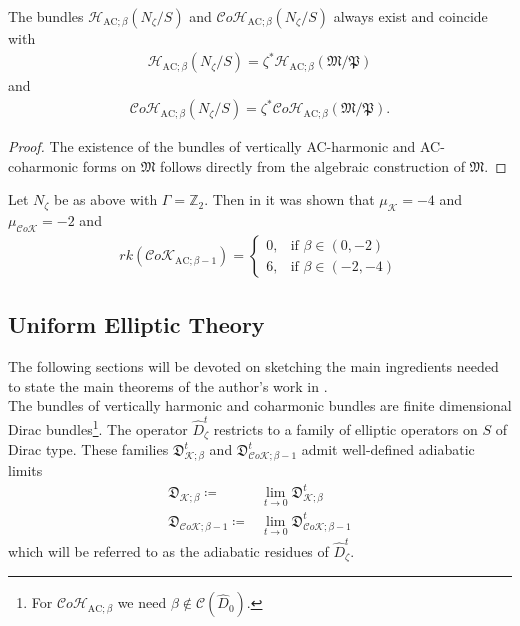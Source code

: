 \documentclass[psamsfonts]{amsart}
\theoremstyle{plain}
\theoremstyle{definition}{
\newtheorem{defi}{Definition}[section]
\newtheorem{ass}{Assumption}
\newtheorem*{nota}{Notation}}
\theoremstyle{remark}{
\newtheorem{rem}{Remark}
\newtheorem{ex}{Example}}
\theoremstyle{plain}{
\newtheorem{thm}{Theorem}[section]
\newtheorem{lem}{Lemma}[section]
\newtheorem{cor}{Corollary}[section]
\newtheorem{prop}{Proposition}[section]
\newtheorem{con}{Conjecture}[section]}
\newcommand{\m}[1]{{\mathrm{#1}}}
\begin{document}
\begin{lem}
\label{bundlesexist}
    The bundles $\mathcal{H}_{\m{AC};\beta}(N_\zeta/S)$ and $\mathcal{C}o\mathcal{H}_{\m{AC};\beta}(N_\zeta/S)$ always exist and coincide with 
    \begin{align*}
        \mathcal{H}_{\m{AC};\beta}(N_\zeta/S)=\zeta^*\mathcal{H}_{\m{AC};\beta}(\mathfrak{M}/\mathfrak{P})
    \end{align*}
    and
    \begin{align*}
        \mathcal{C}o\mathcal{H}_{\m{AC};\beta}(N_\zeta/S)=\zeta^*\mathcal{C}o\mathcal{H}_{\m{AC};\beta}(\mathfrak{M}/\mathfrak{P}).
    \end{align*}
\end{lem}

\begin{proof}
    The existence of the bundles of vertically AC-harmonic and AC-coharmonic forms on $\mathfrak{M}$ follows directly from the algebraic construction of $\mathfrak{M}$.
\end{proof}


\begin{ex}
    Let $N_\zeta$ be as above with $\Gamma=\mathbb{Z}_2$. Then in \cite[Thm. 3.26]{platt} it was shown that $\mu_{\mathcal{K}}=-4$ and $\mu_{\mathcal{C}o\mathcal{K}}=-2$ and
    \begin{align*}
        rk(\mathcal{C}o\mathcal{K}_{\m{AC};\beta-1})=\left\{\begin{array}{ll}
             0,&\text{if } \beta\in(0,-2) \\
             6,&\text{if } \beta\in(-2,-4)
        \end{array}\right.
    \end{align*}
\end{ex}



\subsection{Uniform Elliptic Theory}
\label{Uniform Ellitpic Theory}




The following sections will be devoted on sketching the main ingredients needed to state the main theorems of the author's work in \cite{majewskiDirac}.\\

The bundles of vertically harmonic and coharmonic bundles are finite dimensional Dirac bundles\footnote{For $\mathcal{C}o\mathcal{H}_{\m{AC};\beta}$ we need $\beta\notin\mathcal{C}(\widehat{D}_0)$.}. The operator $\widehat{D}^t_\zeta$ restricts to a family of elliptic operators on $S$ of Dirac type. These families $\mathfrak{D}^t_{\mathcal{K};\beta}$ and $\mathfrak{D}^t_{\mathcal{C}o\mathcal{K};\beta-1}$ admit well-defined adiabatic limits
\begin{align*}
    \mathfrak{D}_{\mathcal{K};\beta}\coloneqq&\lim_{t\to0}\mathfrak{D}^t_{\mathcal{K};\beta}\\
    \mathfrak{D}_{\mathcal{C}o\mathcal{K};\beta-1}\coloneqq&\lim_{t\to0}\mathfrak{D}^t_{\mathcal{C}o\mathcal{K};\beta-1}
\end{align*}
which will be referred to as the adiabatic residues of $\widehat{D}^t_\zeta$.
\end{document}
